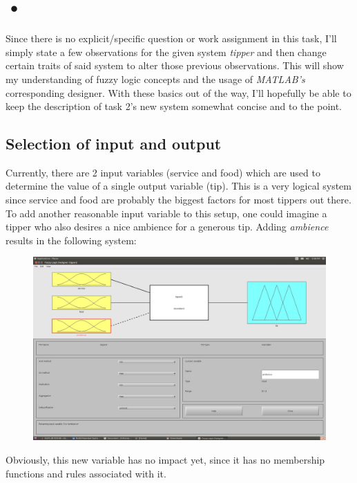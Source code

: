 \documentclass[a4paper, 11pt]{article}
\begin{document}
\section{•}
Since there is no explicit/specific question or work assignment in this task, I'll simply state a few observations for the given system \textit{tipper} and then change certain traits of said system to alter those previous observations. This will show my understanding of fuzzy logic concepts and the usage of \textit{MATLAB's} corresponding designer. With these basics out of the way, I'll hopefully be able to keep the description of task 2's new system somewhat concise and to the point.

\subsection{Selection of input and output}
Currently, there are 2 input variables (service and food) which are used to determine the value of a single output variable (tip). This is a very logical system since service and food are probably the biggest factors for most tippers out there. To add another reasonable input variable to this setup, one could imagine a tipper who also desires a nice ambience for a generous tip. Adding \textit{ambience} results in the following system:

\begin{figure}[ht]
\includegraphics[scale=0.2]{ambience-added.jpg}
\end{figure}
Obviously, this new variable has no impact yet, since it has no membership functions and rules associated with it.

\newpage
\end{document}
